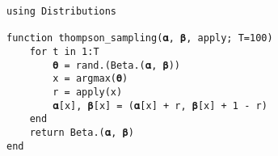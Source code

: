 \documentclass[11pt]{article}
\begin{document}
\begin{lstlisting}[language=JuliaLocal]
using Distributions

function thompson_sampling(𝛂, 𝛃, apply; T=100)
    for t in 1:T
        𝛉 = rand.(Beta.(𝛂, 𝛃))
        x = argmax(𝛉)
        r = apply(x)
        𝛂[x], 𝛃[x] = (𝛂[x] + r, 𝛃[x] + 1 - r)
    end
    return Beta.(𝛂, 𝛃)
end
\end{lstlisting}
\end{document}
